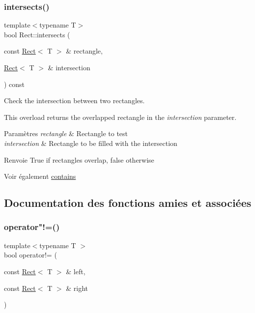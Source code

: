 \subsubsection{\texorpdfstring{intersects()}{intersects()}\hspace{0.1cm}{\footnotesize\ttfamily [2/2]}}
{\footnotesize\ttfamily template$<$typename T$>$ \\
bool Rect\+::intersects (\begin{DoxyParamCaption}\item[{const \hyperlink{classsf_1_1Rect}{Rect}$<$ T $>$ \&}]{rectangle,  }\item[{\hyperlink{classsf_1_1Rect}{Rect}$<$ T $>$ \&}]{intersection }\end{DoxyParamCaption}) const}



Check the intersection between two rectangles. 

This overload returns the overlapped rectangle in the {\itshape intersection} parameter.


\begin{DoxyParams}{Paramètres}
{\em rectangle} & Rectangle to test \\
\hline
{\em intersection} & Rectangle to be filled with the intersection\\
\hline
\end{DoxyParams}
\begin{DoxyReturn}{Renvoie}
True if rectangles overlap, false otherwise
\end{DoxyReturn}
\begin{DoxySeeAlso}{Voir également}
\hyperlink{classsf_1_1Rect_a1d8a4a3aecec18310f6e3e23db43dfb8}{contains} 
\end{DoxySeeAlso}


\subsection{Documentation des fonctions amies et associées}
\mbox{\label{classsf_1_1Rect_a03fc4c105687b7d0f07b6b4ed4b45581}} 
\subsubsection{\texorpdfstring{operator"!=()}{operator!=()}}
{\footnotesize\ttfamily template$<$typename T $>$ \\
bool operator!= (\begin{DoxyParamCaption}\item[{const \hyperlink{classsf_1_1Rect}{Rect}$<$ T $>$ \&}]{left,  }\item[{const \hyperlink{classsf_1_1Rect}{Rect}$<$ T $>$ \&}]{right }\end{DoxyParamCaption})\hspace{0.3cm}{\ttfamily [related]}}



